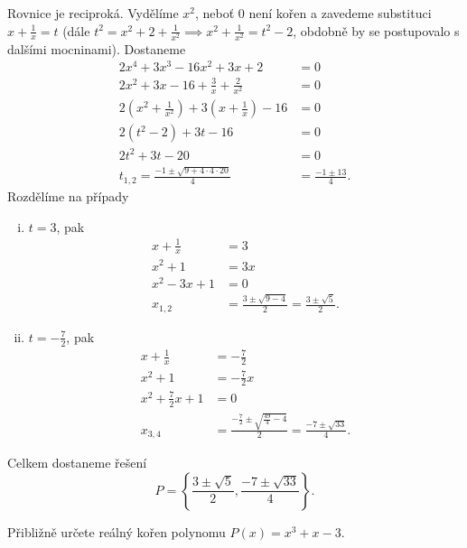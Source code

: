 \begin{reseni}
Rovnice je reciproká. Vydělíme $x^2$, neboť 0 není kořen a zavedeme substituci
$x+\frac{1}{x}=t$ (dále $t^2= x^2 + 2 + \frac{1}{x^2} \implies x^2 + \frac{1}{x^2} = t^2 - 2$, obdobně by se postupovalo s dalšími mocninami).
Dostaneme
\begin{align*}
	2x^4+3x^3-16x^2+3x+2&=0\\
	2x^2+3x-16+\frac{3}{x}+\frac{2}{x^2}&=0\\
	2\left(x^2+\frac{1}{x^2}\right)+3\left(x+\frac{1}{x}\right)-16&=0\\
	2(t^2-2)+3t-16&=0\\
	2t^2+3t-20 &= 0\\
	t_{1,2} = \frac{-1\pm \sqrt{9+4\cdot4\cdot20}}{4} &= \frac{-1 \pm 13}{4}.
\end{align*}
Rozdělíme na případy
\begin{enumerate}[i.]
	\item $t = 3$, pak
	\begin{align*}
		x + \frac{1}{x} &= 3\\
		x^2+1&=3x\\
		x^2-3x + 1 &= 0\\
		x_{1,2} &= \frac{3 \pm \sqrt{9-4}}{2} = \frac{3 \pm \sqrt{5}}{2}.
	\end{align*}
	\item $t = -\frac{7}{2}$, pak
	\begin{align*}
	    x + \frac{1}{x} &= -\frac{7}{2}\\
		x^2+1&=-\frac{7}{2}x\\
		x^2+\frac{7}{2}x + 1 &= 0\\
		x_{3,4} &= \frac{-\frac{7}{2} \pm \sqrt{\frac{49}{4}-4}}{2} = \frac{-7\pm \sqrt{33}}{4}.
	\end{align*}
\end{enumerate}
Celkem dostaneme řešení
$$P = \left\{\frac{3 \pm \sqrt{5}}{2}, \frac{-7\pm \sqrt{33}}{4}\right\}.$$
\end{reseni}

\begin{priklad}
Přibližně určete reálný kořen polynomu $P(x)=x^3+x-3$.
\end{priklad}


